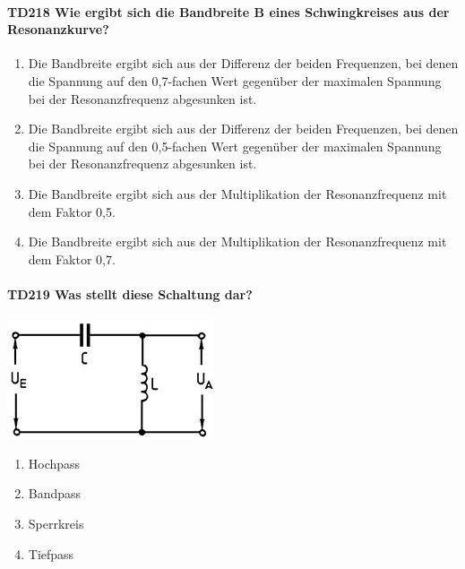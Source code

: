 \documentclass[8pt]{article}
\begin{document}
\begin{enumerate}
\begin{enumerate}[nolistsep,label=\Alph*]
{\paragraph*{TD218 Wie ergibt sich die Bandbreite B eines Schwingkreises aus der Resonanzkurve?}
\begin{enumerate}[nolistsep,label=\Alph*]
\item Die Bandbreite ergibt sich aus der Differenz der beiden Frequenzen, bei denen die Spannung auf den 0,7-fachen Wert gegenüber der maximalen Spannung bei der Resonanzfrequenz abgesunken ist.
\item Die Bandbreite ergibt sich aus der Differenz der beiden Frequenzen, bei denen die Spannung auf den 0,5-fachen Wert gegenüber der maximalen Spannung bei der Resonanzfrequenz abgesunken ist.
\item Die Bandbreite ergibt sich aus der Multiplikation der Resonanzfrequenz mit dem Faktor 0,5. 
\item Die Bandbreite ergibt sich aus der Multiplikation der Resonanzfrequenz mit dem Faktor 0,7.
\end{enumerate}

\paragraph*{TD219 Was stellt diese Schaltung dar?}
\begin{center}
	\begin{minipage}{\linewidth}
		\centering
		\includegraphics[scale=1.0]{pics/td219_a.jpg}
	\end{minipage}
\end{center}
\begin{enumerate}[nolistsep,label=\Alph*]
\item Hochpass
\item Bandpass
\item Sperrkreis
\item Tiefpass
\end{enumerate}

}
\end{enumerate}
\end{enumerate}
\end{document}
